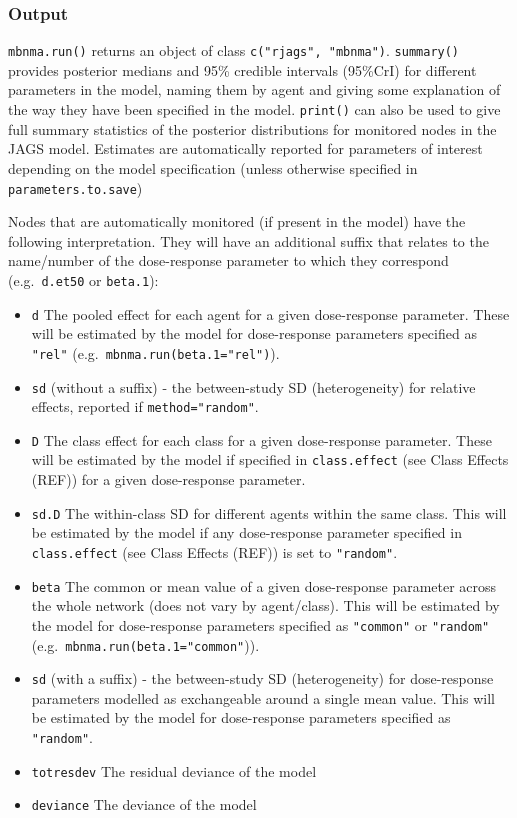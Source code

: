 \documentclass[]{article}
\providecommand{\tightlist}{%
  \setlength{\itemsep}{0pt}\setlength{\parskip}{0pt}}
\begin{document}
\hypertarget{output}{%
\subsubsection{Output}\label{output}}

\texttt{mbnma.run()} returns an object of class
\texttt{c("rjags",\ "mbnma")}. \texttt{summary()} provides posterior
medians and 95\% credible intervals (95\%CrI) for different parameters
in the model, naming them by agent and giving some explanation of the
way they have been specified in the model. \texttt{print()} can also be
used to give full summary statistics of the posterior distributions for
monitored nodes in the JAGS model. Estimates are automatically reported
for parameters of interest depending on the model specification (unless
otherwise specified in \texttt{parameters.to.save})

Nodes that are automatically monitored (if present in the model) have
the following interpretation. They will have an additional suffix that
relates to the name/number of the dose-response parameter to which they
correspond (e.g.~\texttt{d.et50} or \texttt{beta.1}):

\begin{itemize}
\tightlist
\item
  \texttt{d} The pooled effect for each agent for a given dose-response
  parameter. These will be estimated by the model for dose-response
  parameters specified as \texttt{"rel"}
  (e.g.~\texttt{mbnma.run(beta.1="rel")}).
\item
  \texttt{sd} (without a suffix) - the between-study SD (heterogeneity)
  for relative effects, reported if \texttt{method="random"}.
\item
  \texttt{D} The class effect for each class for a given dose-response
  parameter. These will be estimated by the model if specified in
  \texttt{class.effect} (see Class Effects (REF)) for a given
  dose-response parameter.
\item
  \texttt{sd.D} The within-class SD for different agents within the same
  class. This will be estimated by the model if any dose-response
  parameter specified in \texttt{class.effect} (see Class Effects (REF))
  is set to \texttt{"random"}.
\item
  \texttt{beta} The common or mean value of a given dose-response
  parameter across the whole network (does not vary by agent/class).
  This will be estimated by the model for dose-response parameters
  specified as \texttt{"common"} or \texttt{"random"}
  (e.g.~\texttt{mbnma.run(beta.1="common"})).
\item
  \texttt{sd} (with a suffix) - the between-study SD (heterogeneity) for
  dose-response parameters modelled as exchangeable around a single mean
  value. This will be estimated by the model for dose-response
  parameters specified as \texttt{"random"}.
\item
  \texttt{totresdev} The residual deviance of the model
\item
  \texttt{deviance} The deviance of the model
\end{itemize}
\end{document}
